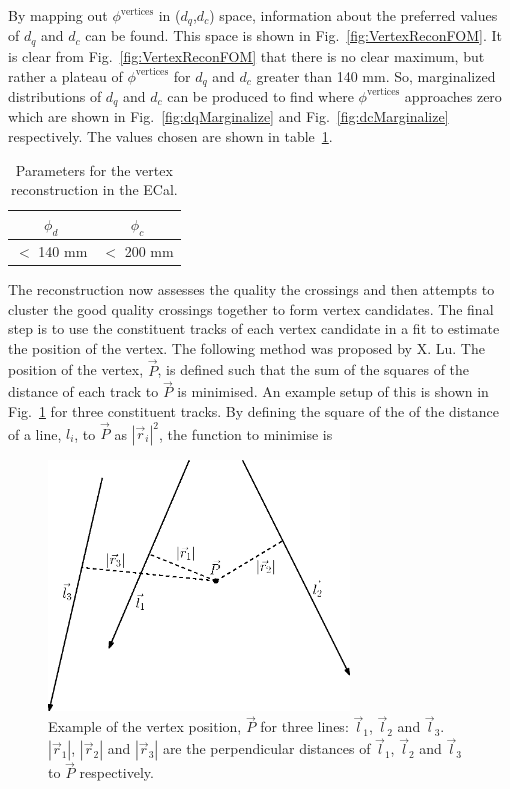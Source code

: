 By mapping out $\phi^{\textrm{vertices}}$ in ($d_q$,$d_c$) space, information about the preferred values of $d_q$ and $d_c$ can be found.  This space is shown in Fig.~\ref{fig:VertexReconFOM}.  It is clear from Fig.~\ref{fig:VertexReconFOM} that there is no clear maximum, but rather a plateau of  $\phi^{\textrm{vertices}}$ for $d_q$ and $d_c$ greater than 140 mm.  So, marginalized distributions of $d_q$ and $d_c$ can be produced to find where $\phi^{\textrm{vertices}}$ approaches zero which are shown in Fig.~\ref{fig:dqMarginalize} and Fig.~\ref{fig:dcMarginalize} respectively.  The values chosen are shown in table~\ref{table:VertexReconParameters}. 
\begin{table}[b!]
  \begin{tabular}{ c c }
    $\phi_d$ & $\phi_c$ \\ \hline \hline
    $<$ 140 mm & $<$ 200 mm \\
  \end{tabular}
  \caption{Parameters for the vertex reconstruction in the ECal.}
  \label{table:VertexReconParameters}
\end{table}
The reconstruction now assesses the quality the crossings and then attempts to cluster the good quality crossings together to form vertex candidates.  The final step is to use the constituent tracks of each vertex candidate in a fit to estimate the position of the vertex.  The following method was proposed by X. Lu.  The position of the vertex, $\vec{P}$, is defined such that the sum of the squares of the distance of each track to $\vec{P}$ is minimised.  An example setup of this is shown in Fig.~\ref{fig:VertexVectorDiagram} for three constituent tracks.  By defining the square of the of the distance of a line, $l_i$, to $\vec{P}$ as $|\vec{r}_i|^2$, the function to minimise is
\begin{figure}[!b]
  \centering
  \includegraphics[width=8cm]{images/selection/vertex_recon/vertex_vector_diagram}
  \caption{Example of the vertex position, $\vec{P}$ for three lines: $\vec{l}_1$, $\vec{l}_2$ and $\vec{l}_3$. $|\vec{r}_1|$, $|\vec{r}_2|$ and $|\vec{r}_3|$ are the perpendicular distances of $\vec{l}_1$, $\vec{l}_2$ and $\vec{l}_3$ to $\vec{P}$ respectively.}
  \label{fig:VertexVectorDiagram}
\end{figure}
